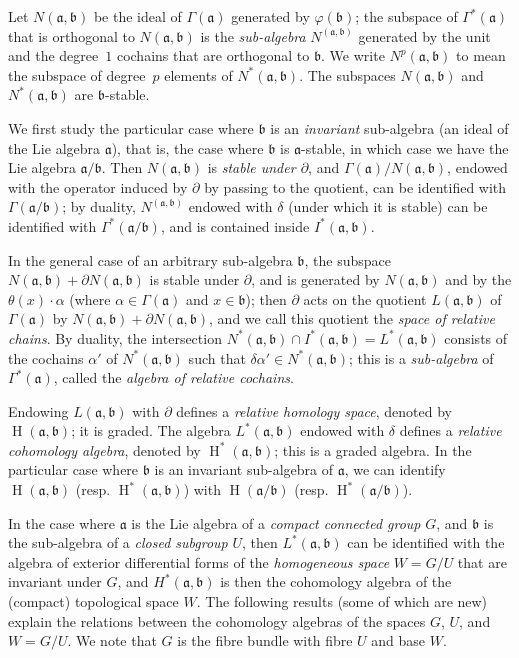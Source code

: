 \documentclass{article}
\newcommand{\fk}{\mathfrak}
\DeclareMathOperator{\HH}{H}
\newcommand{\oldpage}[1]{\marginpar{\footnotesize$\Big\vert$ \textit{p.~#1}}}
\begin{document}
\oldpage{72}
Let $N(\fk{a},\fk{b})$ be the ideal of $\Gamma(\fk{a})$ generated by $\varphi(\fk{b})$;
the subspace of $\Gamma^*(\fk{a})$ that is orthogonal to $N(\fk{a},\fk{b})$ is the \emph{sub-algebra} $N^(\fk{a},\fk{b})$ generated by the unit and the degree~$1$ cochains that are orthogonal to $\fk{b}$.
We write $N^p(\fk{a},\fk{b})$ to mean the subspace of degree~$p$ elements of $N^*(\fk{a},\fk{b})$.
The subspaces $N(\fk{a},\fk{b})$ and $N^*(\fk{a},\fk{b})$ are $\fk{b}$-stable.

We first study the particular case where $\fk{b}$ is an \emph{invariant} sub-algebra (an ideal of the Lie algebra $\fk{a}$), that is, the case where $\fk{b}$ is $\fk{a}$-stable, in which case we have the Lie algebra $\fk{a}/\fk{b}$.
Then $N(\fk{a},\fk{b})$ is \emph{stable under $\partial$}, and $\Gamma(\fk{a})/N(\fk{a},\fk{b})$, endowed with the operator induced by $\partial$ by passing to the quotient, can be identified with $\Gamma(\fk{a}/\fk{b})$;
by duality, $N^(\fk{a},\fk{b})$ endowed with $\delta$ (under which it is stable) can be identified with $\Gamma^*(\fk{a}/\fk{b})$, and is contained inside $I^*(\fk{a},\fk{b})$.

In the general case of an arbitrary sub-algebra $\fk{b}$, the subspace $N(\fk{a},\fk{b})+\partial N(\fk{a},\fk{b})$ is stable under $\partial$, and is generated by $N(\fk{a},\fk{b})$ and by the $\theta(x)\cdot\alpha$ (where $\alpha\in\Gamma(\fk{a})$ and $x\in\fk{b}$);
then $\partial$ acts on the quotient $L(\fk{a},\fk{b})$ of $\Gamma(\fk{a})$ by $N(\fk{a},\fk{b})+\partial N(\fk{a},\fk{b})$, and we call this quotient the \emph{space of relative chains}.
By duality, the intersection $N^*(\fk{a},\fk{b})\cap I^*(\fk{a},\fk{b}) = L^*(\fk{a},\fk{b})$ consists of the cochains $\alpha'$ of $N^*(\fk{a},\fk{b})$ such that $\delta\alpha'\in N^*(\fk{a},\fk{b})$;
this is a \emph{sub-algebra} of $\Gamma^*(\fk{a})$, called the \emph{algebra of relative cochains}.

Endowing $L(\fk{a},\fk{b})$ with $\partial$ defines a \emph{relative homology space}, denoted by $\HH(\fk{a},\fk{b})$;
it is graded.
The algebra $L^*(\fk{a},\fk{b})$ endowed with $\delta$ defines a \emph{relative cohomology algebra}, denoted by $\HH^*(\fk{a},\fk{b})$;
this is a graded algebra.
In the particular case where $\fk{b}$ is an invariant sub-algebra of $\fk{a}$, we can identify $\HH(\fk{a},\fk{b})$ (resp. $\HH^*(\fk{a},\fk{b})$) with $\HH(\fk{a}/\fk{b})$ (resp. $\HH^*(\fk{a}/\fk{b})$).

In the case where $\fk{a}$ is the Lie algebra of a \emph{compact connected group} $G$, and $\fk{b}$ is the sub-algebra of a \emph{closed subgroup} $U$, then $L^*(\fk{a},\fk{b})$ can be identified with the algebra of exterior differential forms of the \emph{homogeneous space} $W=G/U$ that are invariant under $G$, and $H^*(\fk{a},\fk{b})$ is then the cohomology algebra of the (compact) topological space $W$.
The following results (some of which are new) explain the relations between the cohomology algebras of the spaces $G$, $U$, and $W=G/U$.
We note that $G$ is the fibre bundle with fibre $U$ and base $W$.
\end{document}
